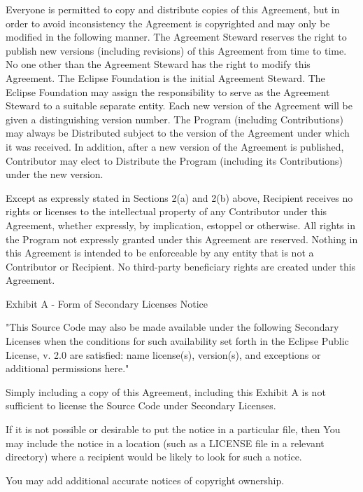 Everyone is permitted to copy and distribute copies of this Agreement,
but in order to avoid inconsistency the Agreement is copyrighted and
may only be modified in the following manner. The Agreement Steward
reserves the right to publish new versions (including revisions) of
this Agreement from time to time. No one other than the Agreement
Steward has the right to modify this Agreement. The Eclipse Foundation
is the initial Agreement Steward. The Eclipse Foundation may assign the
responsibility to serve as the Agreement Steward to a suitable separate
entity. Each new version of the Agreement will be given a distinguishing
version number. The Program (including Contributions) may always be
Distributed subject to the version of the Agreement under which it was
received. In addition, after a new version of the Agreement is published,
Contributor may elect to Distribute the Program (including its
Contributions) under the new version.

Except as expressly stated in Sections 2(a) and 2(b) above, Recipient
receives no rights or licenses to the intellectual property of any
Contributor under this Agreement, whether expressly, by implication,
estoppel or otherwise. All rights in the Program not expressly granted
under this Agreement are reserved. Nothing in this Agreement is intended
to be enforceable by any entity that is not a Contributor or Recipient.
No third-party beneficiary rights are created under this Agreement.

Exhibit A - Form of Secondary Licenses Notice

"This Source Code may also be made available under the following 
Secondary Licenses when the conditions for such availability set forth 
in the Eclipse Public License, v. 2.0 are satisfied: {name license(s),
	version(s), and exceptions or additional permissions here}."

Simply including a copy of this Agreement, including this Exhibit A
is not sufficient to license the Source Code under Secondary Licenses.

If it is not possible or desirable to put the notice in a particular
file, then You may include the notice in a location (such as a LICENSE
file in a relevant directory) where a recipient would be likely to
look for such a notice.

You may add additional accurate notices of copyright ownership.


